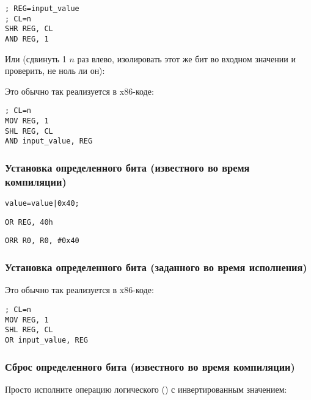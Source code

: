 \begin{lstlisting}[caption=x86]
; REG=input_value
; CL=n
SHR REG, CL
AND REG, 1
\end{lstlisting}

Или (сдвинуть 1 $n$ раз влево, изолировать этот же бит во входном значении и проверить, не ноль ли он):



Это обычно так реализуется в x86-коде:

\begin{lstlisting}[caption=x86]
; CL=n
MOV REG, 1
SHL REG, CL
AND input_value, REG
\end{lstlisting}

\subsubsection{Установка определенного бита (известного во время компиляции)}

\begin{lstlisting}[caption=\CCpp]
value=value|0x40;
\end{lstlisting}

\begin{lstlisting}[caption=x86]
OR REG, 40h
\end{lstlisting}

\begin{lstlisting}[caption=ARM (\ARMMode) и ARM64]
ORR R0, R0, #0x40
\end{lstlisting}

\subsubsection{Установка определенного бита (заданного во время исполнения)}



Это обычно так реализуется в x86-коде:

\begin{lstlisting}[caption=x86]
; CL=n
MOV REG, 1
SHL REG, CL
OR input_value, REG
\end{lstlisting}

\subsubsection{Сброс определенного бита (известного во время компиляции)}

Просто исполните операцию логического  (\AND) с инвертированным значением:

